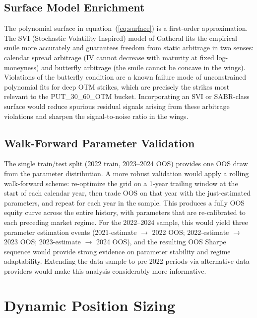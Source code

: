\documentclass[10pt,twocolumn]{article}
\begin{document}
\subsection{Surface Model Enrichment}

The polynomial surface in equation~(\ref{eq:surface}) is a first-order
approximation. The SVI (Stochastic Volatility Inspired) model of Gatheral
\cite{gatheral2006} fits the empirical smile more accurately and guarantees
freedom from static arbitrage in two senses: calendar spread arbitrage
(IV cannot decrease with maturity at fixed log-moneyness) and butterfly
arbitrage (the smile cannot be concave in the wings).  Violations of the
butterfly condition are a known failure mode of unconstrained polynomial fits
for deep OTM strikes, which are precisely the strikes most relevant to the
PUT\_30\_60\_OTM bucket.  Incorporating an SVI or SABR-class surface would
reduce spurious residual signals arising from these arbitrage violations and
sharpen the signal-to-noise ratio in the wings.

\subsection{Walk-Forward Parameter Validation}

The single train/test split (2022 train, 2023--2024 OOS) provides one
OOS draw from the parameter distribution.  A more robust validation
would apply a rolling walk-forward scheme: re-optimize the grid on a
1-year trailing window at the start of each calendar year, then trade
OOS on that year with the just-estimated parameters, and repeat for each
year in the sample.  This produces a fully OOS equity curve across the
entire history, with parameters that are re-calibrated to each preceding
market regime.  For the 2022--2024 sample, this would yield three parameter
estimation events (2021-estimate $\to$ 2022 OOS; 2022-estimate $\to$ 2023
OOS; 2023-estimate $\to$ 2024 OOS), and the resulting OOS Sharpe sequence
would provide strong evidence on parameter stability and regime adaptability.
Extending the data sample to pre-2022 periods via alternative data
providers would make this analysis considerably more informative.


\section{Dynamic Position Sizing}
\label{sec:dynamic_sizing}
\end{document}
